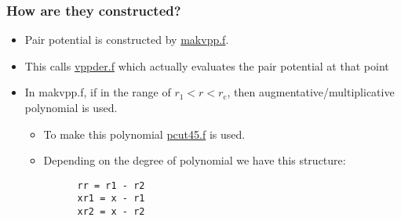 \documentclass[11pt]{article}
\begin{document}
\subsubsection{How are they constructed?}
\label{sec-2-3-1}
\begin{itemize}
\item Pair potential is constructed by \href{file:///home/tigany/lm/tb/makvpp.f}{makvpp.f}.
\item This calls \href{file:///home/tigany/lm/tb/vppder.f}{vppder.f} which actually evaluates the pair potential at that
point
\item In makvpp.f, if in the range of $r_1 < r < r_{\text{c}}$, then
augmentative/multiplicative polynomial is used.
\begin{itemize}
\item To make this polynomial \href{file:///home/tigany/lm/tb/pcut45.f}{pcut45.f} is used.
\item Depending on the degree of polynomial we have this structure:
\begin{verbatim}
      rr = r1 - r2
      xr1 = x - r1
      xr2 = x - r2


\end{verbatim}
\end{itemize}
\end{itemize}
\end{document}
